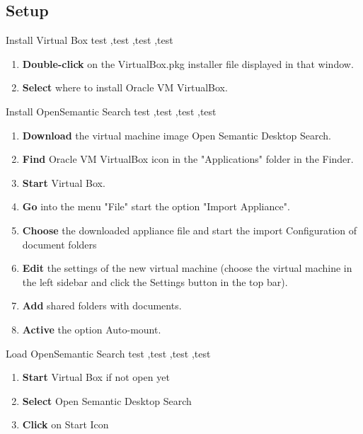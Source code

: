 \documentclass[10pt,a4paper]{article}
\begin{document}
\subsection{Setup}


\begin{textbox}{Install Virtual Box}
test  \sep test \sep test \sep test

\bigskip


\begin{enumerate}
\item \textbf {Double-click} on the VirtualBox.pkg installer file displayed in that window.
\item \textbf {Select} where to install Oracle VM VirtualBox.

\end{enumerate}


\end{textbox}

\begin{textbox}{Install OpenSemantic Search}
test  \sep test \sep test \sep test

\bigskip

\begin{enumerate}
\item \textbf{Download} the virtual machine image Open Semantic Desktop Search. 
\item \textbf {Find} Oracle VM VirtualBox icon in the "Applications" folder in the Finder.
\item \textbf{Start} Virtual Box.
\item \textbf{Go} into the menu "File" start the option "Import Appliance".
\item \textbf{Choose} the downloaded appliance file and start the import Configuration of document folders
\item \textbf{Edit} the settings of the new virtual machine (choose the virtual machine in the left sidebar and click the Settings button in the top bar).
\item \textbf{Add} shared folders with documents.
\item \textbf{Active} the option Auto-mount.
\end{enumerate}

\end{textbox}

\begin{textbox}{Load OpenSemantic Search}
test  \sep test \sep test \sep test

\bigskip

\begin{enumerate}
\item \textbf{Start} Virtual Box if not open yet
\item \textbf{Select} Open Semantic Desktop Search 
\item \textbf{Click} on Start Icon 
\end{enumerate}

\end{textbox}
\end{document}
